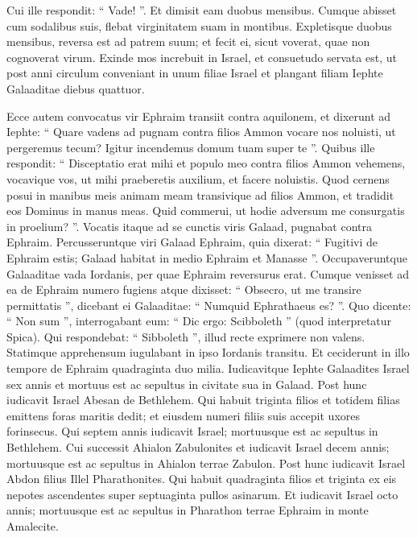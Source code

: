 \begin{biblechapter}
\begin{biblechapter}
\begin{biblechapter}
\begin{biblechapter}
\begin{biblechapter}
\begin{biblechapter}
\begin{biblechapter}
\begin{biblechapter}
\begin{biblechapter}
\begin{biblechapter}
\begin{biblechapter}
\verse Cui ille respondit: “ Vade! ”. Et dimisit eam duobus mensibus. Cumque abisset cum sodalibus suis, flebat virginitatem suam in montibus. 
\verse Expletisque duobus mensibus, reversa est ad patrem suum; et fecit ei, sicut voverat, quae non cognoverat virum. Exinde mos increbuit in Israel, et consuetudo servata est, 
 \verse ut post anni circulum conveniant in unum filiae Israel et plangant filiam Iephte Galaaditae diebus quattuor.
 
\begin{biblechapter}
\verse Ecce autem convocatus vir Ephraim transiit contra aquilonem, et dixerunt ad Iephte: “ Quare vadens ad pugnam contra filios Ammon vocare nos noluisti, ut pergeremus tecum? Igitur incendemus domum tuam super te ”. 
\verse Quibus ille respondit: “ Disceptatio erat mihi et populo meo contra filios Ammon vehemens, vocavique vos, ut mihi praeberetis auxilium, et facere noluistis. 
\verse Quod cernens posui in manibus meis animam meam transivique ad filios Ammon, et tradidit eos Dominus in manus meas. Quid commerui, ut hodie adversum me consurgatis in proelium? ”.
 \verse Vocatis itaque ad se cunctis viris Galaad, pugnabat contra Ephraim. Percusseruntque viri Galaad Ephraim, quia dixerat: “ Fugitivi de Ephraim estis; Galaad habitat in medio Ephraim et Manasse ”. 
\verse Occupaveruntque Galaaditae vada Iordanis, per quae Ephraim reversurus erat. Cumque venisset ad ea de Ephraim numero fugiens atque dixisset: “ Obsecro, ut me transire permittatis ”, dicebant ei Galaaditae: “ Numquid Ephrathaeus es? ”. Quo dicente: “ Non sum ”, 
 \verse interrogabant eum: “ Dic ergo: Scibboleth ” (quod interpretatur Spica). Qui respondebat: “ Sibboleth ”, illud recte exprimere non valens. Statimque apprehensum iugulabant in ipso Iordanis transitu. Et ceciderunt in illo tempore de Ephraim quadraginta duo milia.
 \verse Iudicavitque Iephte Galaadites Israel sex annis et mortuus est ac sepultus in civitate sua in Galaad.
 \verse Post hunc iudicavit Israel Abesan de Bethlehem. 
\verse Qui habuit triginta filios et totidem filias emittens foras maritis dedit; et eiusdem numeri filiis suis accepit uxores forinsecus. Qui septem annis iudicavit Israel; 
\verse mortuusque est ac sepultus in Bethlehem.
 \verse Cui successit Ahialon Zabulonites et iudicavit Israel decem annis; 
\verse mortuusque est ac sepultus in Ahialon terrae Zabulon.
 \verse Post hunc iudicavit Israel Abdon filius Illel Pharathonites. 
\verse Qui habuit quadraginta filios et triginta ex eis nepotes ascendentes super septuaginta pullos asinarum. Et iudicavit Israel octo annis; 
\verse mortuusque est ac sepultus in Pharathon terrae Ephraim in monte Amalecite.
 

\end{biblechapter}
\end{biblechapter}
\end{biblechapter}
\end{biblechapter}
\end{biblechapter}
\end{biblechapter}
\end{biblechapter}
\end{biblechapter}
\end{biblechapter}
\end{biblechapter}
\end{biblechapter}
\end{biblechapter}
